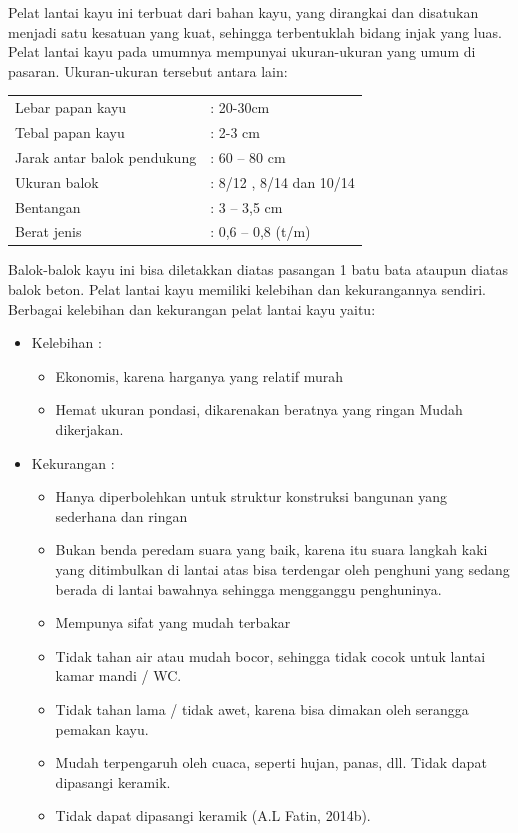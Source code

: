 \documentclass[../modul_skb.tex]{subfiles}
\begin{document}
Pelat lantai kayu ini terbuat dari bahan kayu, yang dirangkai dan disatukan menjadi satu kesatuan yang kuat, sehingga terbentuklah bidang injak yang luas. Pelat lantai kayu pada umumnya mempunyai ukuran-ukuran yang umum di pasaran. Ukuran-ukuran tersebut antara lain:

\begin{tabular}{l l}
	\hline
	Lebar papan kayu             &  : 20-30cm  \\
	Tebal papan kayu             &  : 2-3 cm  \\
	Jarak antar balok pendukung  &  : 60 – 80 cm  \\
	Ukuran balok                 &  : 8/12 , 8/14 dan 10/14  \\
	Bentangan                    &  : 3 – 3,5 cm  \\
	Berat jenis                  &  : 0,6 – 0,8 (t/m)  \\
\end{tabular}

Balok-balok kayu ini bisa diletakkan diatas pasangan 1 batu bata ataupun diatas balok beton. Pelat lantai kayu memiliki kelebihan dan kekurangannya sendiri. Berbagai kelebihan dan kekurangan pelat lantai kayu yaitu:

\begin{itemize}
	\item Kelebihan :
	      \begin{itemize}
		      \item Ekonomis, karena harganya yang relatif murah
		      \item Hemat ukuran pondasi, dikarenakan beratnya yang ringan Mudah dikerjakan.
	      \end{itemize}

	\item Kekurangan :
	      \begin{itemize}
		      \item Hanya diperbolehkan untuk struktur konstruksi bangunan yang sederhana dan ringan
		      \item Bukan benda peredam suara yang baik, karena itu suara langkah kaki yang ditimbulkan di lantai atas bisa terdengar oleh penghuni yang sedang berada di lantai bawahnya sehingga mengganggu penghuninya.
		      \item Mempunya sifat yang mudah terbakar
		      \item Tidak tahan air atau mudah bocor, sehingga tidak cocok untuk lantai kamar mandi / WC.
		      \item Tidak tahan lama / tidak awet, karena bisa dimakan oleh serangga pemakan kayu.
		      \item Mudah terpengaruh oleh cuaca, seperti hujan, panas, dll. Tidak dapat dipasangi keramik.
		      \item Tidak dapat dipasangi keramik (A.L Fatin, 2014b).
	      \end{itemize}

\end{itemize}
\end{document}
